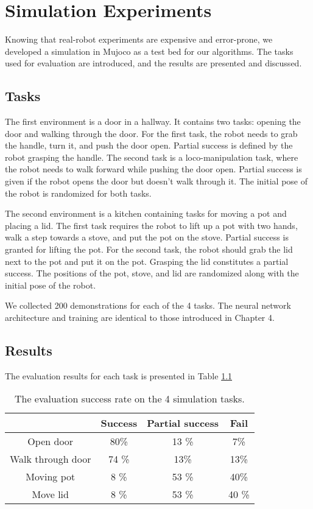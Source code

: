 \chapter{Simulation Experiments}

Knowing that real-robot experiments are expensive and error-prone, we developed a simulation in Mujoco as a test bed for our algorithms. The tasks used for evaluation are introduced, and the results are presented and discussed. 

\section{Tasks}

The first environment is a door in a hallway. It contains two tasks: opening the door and walking through the door. For the first task, the robot needs to grab the handle, turn it, and push the door open. Partial success is defined by the robot grasping the handle. The second task is a loco-manipulation task, where the robot needs to walk forward while pushing the door open. Partial success is given if the robot opens the door but doesn't walk through it. The initial pose of the robot is randomized for both tasks. 

The second environment is a kitchen containing tasks for moving a pot and placing a lid. The first task requires the robot to lift up a pot with two hands, walk a step towards a stove, and put the pot on the stove. Partial success is granted for lifting the pot. For the second task, the robot should grab the lid next to the pot and put it on the pot. Grasping the lid constitutes a partial success. The positions of the pot, stove, and lid are randomized along with the initial pose of the robot. 

We collected 200 demonstrations for each of the 4 tasks. The neural network architecture and training are identical to those introduced in Chapter 4. 

\section{Results}

The evaluation results for each task is presented in Table \ref{table:results}

\begin{table}[h]
	\centering
	\begin{tabular}{|c|c|c|c|}
		\hline
		& Success & Partial success & Fail\\
		\hline
		Open door & 80\% & 13 \% & 7\% \\
		\hline
		Walk through door & 74 \% & 13\% & 13\%\\
		\hline
		Moving pot & 8 \% & 53 \% & 40\%\\
		\hline
		Move lid & 8 \% & 53 \% & 40 \%\\
		\hline
	\end{tabular}
	\caption{The evaluation success rate on the 4 simulation tasks.}
	\label{table:results}
\end{table}
